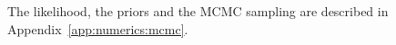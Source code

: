 The likelihood, the priors and the MCMC sampling are described in Appendix~\ref{app:numerics:mcmc}.

